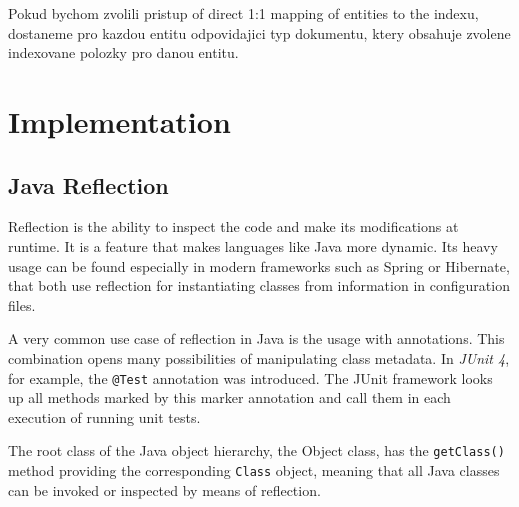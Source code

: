 \documentclass[12pt, oneside, a4paper]{book}
\begin{document}
Pokud bychom zvolili pristup of direct 1:1 mapping of entities to the indexu,
dostaneme pro kazdou entitu odpovidajici typ dokumentu, ktery obsahuje
zvolene indexovane polozky pro danou entitu. 


\chapter{Implementation}


\section{Java Reflection}

Reflection is the ability to inspect the code and make its modifications at runtime. It is a feature that makes languages like Java more dynamic. Its heavy usage can be found especially in modern frameworks such as Spring or Hibernate, that both use reflection for instantiating classes from information in configuration files. 

A very common use case of reflection in Java is the usage with annotations. This combination opens many possibilities of manipulating class metadata. In \textit{JUnit 4}, for example, the \texttt{@Test} annotation was introduced. The JUnit framework looks up all methods marked by this marker annotation and call them in each execution of running unit tests.

The root class of the Java object hierarchy, the Object class, has the \texttt{getClass()} method providing the corresponding \texttt{Class} object, meaning that all Java classes can be invoked or inspected by means of reflection.
\end{document}
